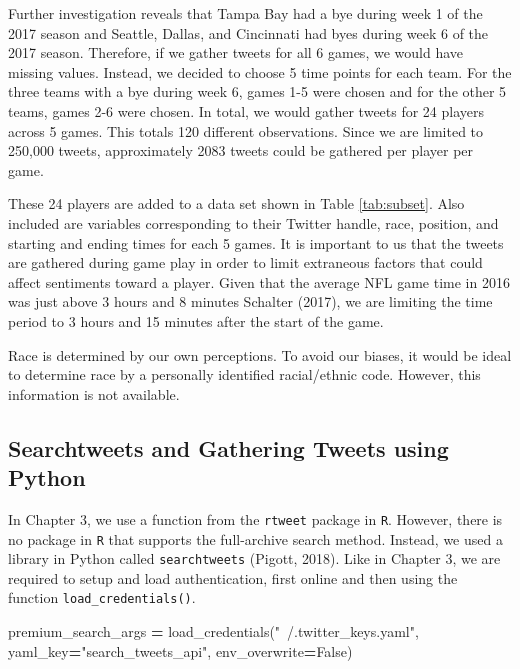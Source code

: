 \documentclass[12pt,twoside]{reedthesis}
\newenvironment{Shaded}{\begin{snugshade}}{\end{snugshade}}
\newcommand{\StringTok}[1]{\textcolor[rgb]{0.31,0.60,0.02}{#1}}
\newcommand{\VariableTok}[1]{\textcolor[rgb]{0.00,0.00,0.00}{#1}}
\newcommand{\OperatorTok}[1]{\textcolor[rgb]{0.81,0.36,0.00}{\textbf{#1}}}
\newcommand{\NormalTok}[1]{#1}
\begin{document}
Further investigation reveals that Tampa Bay had a bye during week 1 of
the 2017 season and Seattle, Dallas, and Cincinnati had byes during week
6 of the 2017 season. Therefore, if we gather tweets for all 6 games, we
would have missing values. Instead, we decided to choose 5 time points
for each team. For the three teams with a bye during week 6, games 1-5
were chosen and for the other 5 teams, games 2-6 were chosen. In total,
we would gather tweets for 24 players across 5 games. This totals 120
different observations. Since we are limited to 250,000 tweets,
approximately 2083 tweets could be gathered per player per game.

These 24 players are added to a data set shown in Table
\ref{tab:subset}. Also included are variables corresponding to their
Twitter handle, race, position, and starting and ending times for each 5
games. It is important to us that the tweets are gathered during game
play in order to limit extraneous factors that could affect sentiments
toward a player. Given that the average NFL game time in 2016 was just
above 3 hours and 8 minutes Schalter (2017), we are limiting the time
period to 3 hours and 15 minutes after the start of the game.

Race is determined by our own perceptions. To avoid our biases, it would
be ideal to determine race by a personally identified racial/ethnic
code. However, this information is not available.

\subsection{Searchtweets and Gathering Tweets using
Python}\label{searchtweets-and-gathering-tweets-using-python}

In Chapter 3, we use a function from the \texttt{rtweet} package in
\texttt{R}. However, there is no package in \texttt{R} that supports the
full-archive search method. Instead, we used a library in Python called
\texttt{searchtweets} (Pigott, 2018). Like in Chapter 3, we are required
to setup and load authentication, first online and then using the
function \texttt{load\_credentials()}.

\small
\begin{Shaded}
\begin{Highlighting}[]
\NormalTok{premium_search_args }\OperatorTok{=}\NormalTok{ load_credentials(}\StringTok{"~/.twitter_keys.yaml"}\NormalTok{,}
\NormalTok{                                          yaml_key}\OperatorTok{=}\StringTok{"search_tweets_api"}\NormalTok{,}
\NormalTok{                                          env_overwrite}\OperatorTok{=}\VariableTok{False}\NormalTok{)}
\end{Highlighting}
\end{Shaded}
\normalsize
\end{document}
